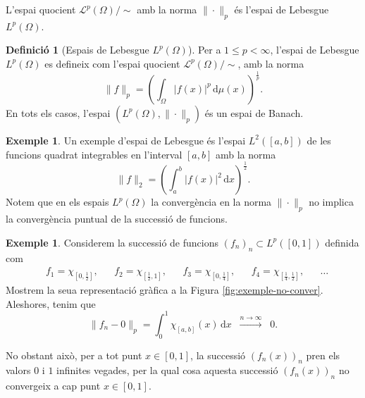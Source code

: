 \documentclass[12pt]{book}
\theoremstyle{definition}
\newtheorem{defi}[teorema]{Definició}
\theoremstyle{nota}
\theoremstyle{exemple}
\newtheorem{exemple}[teorema]{Exemple}
\begin{document}
L'espai quocient $\mathcal{L}^p(\Omega)/\sim$ amb la norma
$\|\cdot\|_p$ és l'espai de Lebesgue $L^p(\Omega)$.

\begin{defi}[Espais de Lebesgue $L^p(\Omega)$]
  Per a $1 \leq p < \infty$, l'espai de Lebesgue $L^p(\Omega)$ es
  defineix com l'espai quocient $\mathcal{L}^p(\Omega) / \sim$, amb la
  norma
  \[
    \|f\|_p = \left( \int_\Omega |f(x)|^p \, \mathrm{d}\mu(x)
    \right)^{\frac{1}{p}}.
  \]
  En tots els casos, l'espai $(L^p(\Omega), \|\cdot\|_p)$ és un espai
  de Banach.
\end{defi}

\begin{exemple}
  Un exemple d'espai de Lebesgue és l'espai $L^2([a,b])$ de les
  funcions quadrat integrables en l'interval $[a,b]$ amb la norma
  \[
    \|f\|_2 = \left( \int_a^b |f(x)|^2 \, \mathrm{d}x \right)^{\frac{1}{2}}.
  \]
  Notem que en els espais $L^p(\Omega)$ la convergència en la norma
  $\|\cdot\|_p$ no implica la convergència puntual de la successió de
  funcions.
\end{exemple}

\begin{exemple}
  Considerem la successió de funcions $(f_n)_n \subset L^p([0,1])$
  definida com
  \begin{align*}
    &f_1 = \chi_{\left[0,\frac{1}{2}\right]}, &
    &f_2 = \chi_{\left[\frac{1}{2},1\right]}, &
    &f_3 = \chi_{\left[0,\frac{1}{4}\right]}, &
    &f_4 = \chi_{\left[\frac{1}{4},\frac{1}{2}\right]}, &
    &\dotsc
  \end{align*}
  Mostrem la seua representació gràfica a la Figura
  \ref{fig:exemple-no-conver}. Aleshores, tenim que
  \[
    \|f_n - 0\|_p = \int_0^1 \chi_{[a,b]}(x) \, \mathrm{d}x
    \;\; \xrightarrow{n \to \infty} \;\; 0.
  \]

  No obstant això, per a tot punt $x \in [0,1]$, la successió
  $(f_n(x))_n$ pren els valors $0$ i $1$ infinites vegades, per la
  qual cosa aquesta successió $(f_n(x))_n$ no convergeix a cap punt
  $x \in [0,1]$.
\end{exemple}
\end{document}
